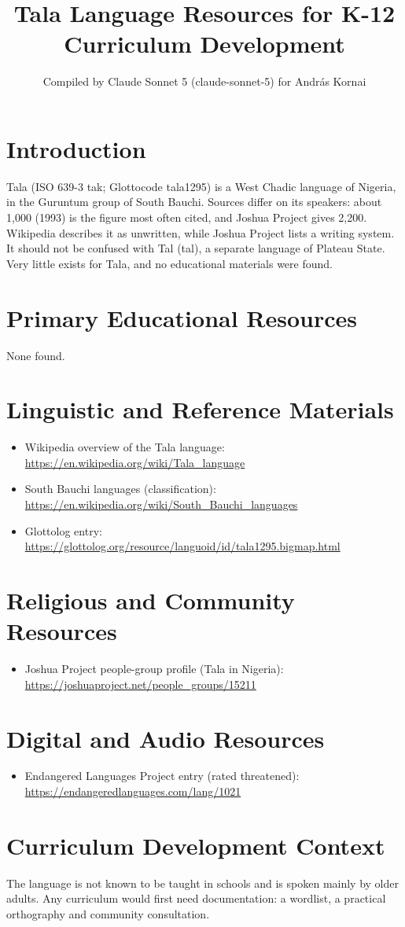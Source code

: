 \documentclass[12pt]{article}
\title{Tala Language Resources for K-12 Curriculum Development}
\author{Compiled by Claude Sonnet 5 (claude-sonnet-5) for Andr\'as Kornai}
\date{}
\begin{document}
\maketitle
\section{Introduction}
Tala (ISO 639-3 tak; Glottocode tala1295) is a West Chadic language of Nigeria, in the Guruntum group of South Bauchi. Sources differ on its speakers: about 1,000 (1993) is the figure most often cited, and Joshua Project gives 2,200. Wikipedia describes it as unwritten, while Joshua Project lists a writing system. It should not be confused with Tal (tal), a separate language of Plateau State. Very little exists for Tala, and no educational materials were found.
\section{Primary Educational Resources}
None found.
\section{Linguistic and Reference Materials}
\begin{itemize}
\item Wikipedia overview of the Tala language: \url{https://en.wikipedia.org/wiki/Tala_language}
\item South Bauchi languages (classification): \url{https://en.wikipedia.org/wiki/South_Bauchi_languages}
\item Glottolog entry: \url{https://glottolog.org/resource/languoid/id/tala1295.bigmap.html}
\end{itemize}
\section{Religious and Community Resources}
\begin{itemize}
\item Joshua Project people-group profile (Tala in Nigeria): \url{https://joshuaproject.net/people_groups/15211}
\end{itemize}
\section{Digital and Audio Resources}
\begin{itemize}
\item Endangered Languages Project entry (rated threatened): \url{https://endangeredlanguages.com/lang/1021}
\end{itemize}
\section{Curriculum Development Context}
The language is not known to be taught in schools and is spoken mainly by older adults. Any curriculum would first need documentation: a wordlist, a practical orthography and community consultation.
\end{document}

